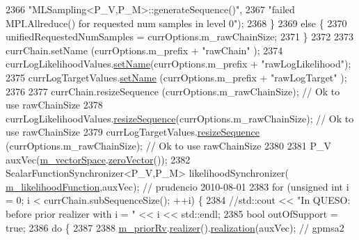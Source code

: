 \begin{DoxyCode}
2366                                    \textcolor{stringliteral}{"MLSampling<P\_V,P\_M>::generateSequence()"},
2367                                    \textcolor{stringliteral}{"failed MPI.Allreduce() for requested num samples in level 0"});
2368     \}
2369     \textcolor{keywordflow}{else} \{
2370       unifiedRequestedNumSamples = currOptions.m\_rawChainSize;
2371     \}
2372 
2373     currChain.setName              (currOptions.m\_prefix + \textcolor{stringliteral}{"rawChain"}        );
2374     currLogLikelihoodValues.\hyperlink{class_q_u_e_s_o_1_1_scalar_sequence_a198b72423333bc5aa1722b830b64a263}{setName}(currOptions.m\_prefix + \textcolor{stringliteral}{"rawLogLikelihood"});
2375     currLogTargetValues.\hyperlink{class_q_u_e_s_o_1_1_scalar_sequence_a198b72423333bc5aa1722b830b64a263}{setName}    (currOptions.m\_prefix + \textcolor{stringliteral}{"rawLogTarget"}    );
2376 
2377     currChain.resizeSequence              (currOptions.m\_rawChainSize); \textcolor{comment}{// Ok to use rawChainSize}
2378     currLogLikelihoodValues.\hyperlink{class_q_u_e_s_o_1_1_scalar_sequence_a2aa8d77c39927060227275b12b6d3dd0}{resizeSequence}(currOptions.m\_rawChainSize); \textcolor{comment}{// Ok to use
       rawChainSize}
2379     currLogTargetValues.\hyperlink{class_q_u_e_s_o_1_1_scalar_sequence_a2aa8d77c39927060227275b12b6d3dd0}{resizeSequence}    (currOptions.m\_rawChainSize); \textcolor{comment}{// Ok to use
       rawChainSize}
2380 
2381     P\_V auxVec(\hyperlink{class_q_u_e_s_o_1_1_m_l_sampling_a7bc4c72f65ba9166ed94a6e198b0915b}{m\_vectorSpace}.\hyperlink{class_q_u_e_s_o_1_1_vector_space_a92e963bb5cab3eecd290dfe4b8f03b04}{zeroVector}());
2382     ScalarFunctionSynchronizer<P\_V,P\_M> likelihoodSynchronizer(
      \hyperlink{class_q_u_e_s_o_1_1_m_l_sampling_ab08c3059d23460db49b229aa88bd4e70}{m\_likelihoodFunction},auxVec); \textcolor{comment}{// prudencio 2010-08-01}
2383     \textcolor{keywordflow}{for} (\textcolor{keywordtype}{unsigned} \textcolor{keywordtype}{int} i = 0; i < currChain.subSequenceSize(); ++i) \{
2384       \textcolor{comment}{//std::cout << "In QUESO: before prior realizer with i = " << i << std::endl;}
2385       \textcolor{keywordtype}{bool} outOfSupport = \textcolor{keyword}{true};
2386       \textcolor{keywordflow}{do} \{
2387 
2388         \hyperlink{class_q_u_e_s_o_1_1_m_l_sampling_aa45e9c06bd51cae0dc2294af1831c158}{m\_priorRv}.\hyperlink{class_q_u_e_s_o_1_1_base_vector_r_v_aea4b01eef0baf36944d14459a7b9ccf4}{realizer}().\hyperlink{class_q_u_e_s_o_1_1_base_vector_realizer_a6845173dd79a80ae11c86cde26e55817}{realization}(auxVec);  \textcolor{comment}{// gpmsa2}

\end{DoxyCode}
